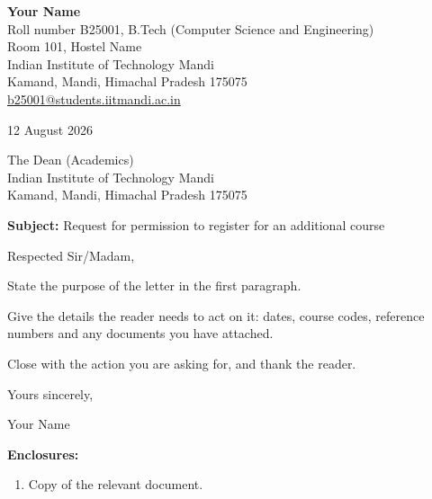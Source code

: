 \documentclass[11pt,a4paper]{article}
\makeatletter
\newcommand{\sendername}{Your Name}
\newcommand{\senderdetails}{%
  Roll number B25001, B.Tech (Computer Science and Engineering)\\
  Room 101, Hostel Name\\
  Indian Institute of Technology Mandi\\
  Kamand, Mandi, Himachal Pradesh 175075\\
  \href{mailto:b25001@students.iitmandi.ac.in}{b25001@students.iitmandi.ac.in}}
\newcommand{\recipient}{%
  The Dean (Academics)\\
  Indian Institute of Technology Mandi\\
  Kamand, Mandi, Himachal Pradesh 175075}
\newcommand{\lettersubject}{Request for permission to register for an additional course}
\newcommand{\letterdate}{12 August 2026}
\makeatother
\begin{document}
\begin{flushright}
  \textbf{\sendername}\\
  \senderdetails
\end{flushright}

\letterdate

\recipient

\textbf{Subject:} \lettersubject

Respected Sir/Madam,

State the purpose of the letter in the first paragraph.

Give the details the reader needs to act on it: dates, course codes,
reference numbers and any documents you have attached.

Close with the action you are asking for, and thank the reader.

\vspace{4mm}
Yours sincerely,

\vspace{14mm}
\sendername

\vspace{6mm}
\textbf{Enclosures:}
\begin{enumerate}
  \item Copy of the relevant document.
\end{enumerate}
\end{document}
